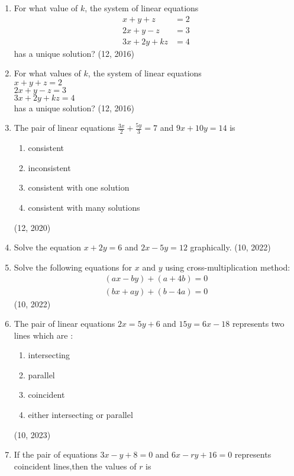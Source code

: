 \begin{enumerate}[label=\thesubsection.\arabic*,ref=\thesubsection.\theenumi]
\item For what value of $k$, the system of linear equations
      \begin{align*}
          x+y+z    & = 2 \\
          2x+y-z   & =3  \\
          3x+2y+kz & =4
      \end{align*}
      has a unique solution? \hfill (12, 2016)
\item For what values of $k$, the system of linear equations\\
      $x+y+z=2$\\
      $2x+y-z=3$\\
      $3x+2y+kz=4$\\
      has a unique solution? \hfill (12, 2016)
\item The pair of linear equations
$\frac{3x}{2}+\frac{5y}{3}=7$ and $9x+10y=14$ is
\begin{enumerate}[label=(\alph*)]
\item consistent
\item inconsistent
\item consistent with one solution 
\item consistent with many solutions 
\end{enumerate}
\hfill (12, 2020)
\item Solve the equation $x+2y=6$ and $2x-5y=12$ graphically.
\hfill (10, 2022)
\item Solve the following equations for $x$ and $y$ using cross-multiplication method:
	\begin{align}
		(ax-by)+(a+4b)=0 \\
                (bx+ay)+(b-4a)=0
	\end{align}
\hfill (10, 2022)
	\item The pair of linear equations $ 2x=5y+6 $ and $ 15y=6x-18 $ represents two lines which are : 
\begin{enumerate}
    \item intersecting
    \item parallel
    \item coincident
    \item either intersecting or parallel
\end{enumerate}
\hfill (10, 2023)
\item If the pair of equations $3x - y + 8 = 0$ and $6x - ry +16 =0$ represents coincident lines,then the values of $r$ is 

\end{enumerate}

